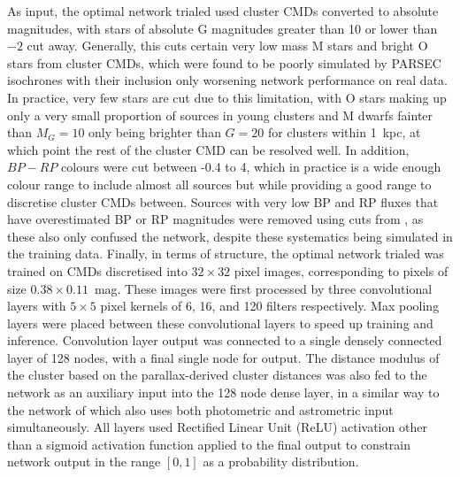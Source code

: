 As input, the optimal network trialed used cluster CMDs converted to absolute magnitudes, with stars of absolute G magnitudes greater than 10 or lower than $-2$ cut away. Generally, this cuts certain very low mass M stars and bright O stars from cluster CMDs, which were found to be poorly simulated by PARSEC isochrones with their inclusion only worsening network performance on real data. In practice, very few stars are cut due to this limitation, with O stars making up only a very small proportion of sources in young clusters and M dwarfs fainter than $M_G=10$ only being brighter than $G=20$ for clusters within 1~kpc, at which point the rest of the cluster CMD can be resolved well. In addition, $BP-RP$ colours were cut between -0.4 to 4, which in practice is a wide enough colour range to include almost all sources but while providing a good range to discretise cluster CMDs between. Sources with very low BP and RP fluxes that have overestimated BP or RP magnitudes were removed using cuts from \cite{riello_gaia_2021}, as these also only confused the network, despite these systematics being simulated in the training data. Finally, in terms of structure, the optimal network trialed was trained on CMDs discretised into $32\times32$ pixel images, corresponding to pixels of size $0.38\times0.11$~mag. These images were first processed by three convolutional layers with $5\times5$ pixel kernels of 6, 16, and 120 filters respectively. Max pooling layers were placed between these convolutional layers to speed up training and inference. Convolution layer output was connected to a single densely connected layer of 128 nodes, with a final single node for output. The distance modulus of the cluster based on the parallax-derived cluster distances was also fed to the network as an auxiliary input into the 128 node dense layer, in a similar way to the network of \cite{cantat-gaudin_painting_2020} which also uses both photometric and astrometric input simultaneously. All layers used Rectified Linear Unit (ReLU) activation other than a sigmoid activation function applied to the final output to constrain network output in the range $[0,1]$ as a probability distribution.

